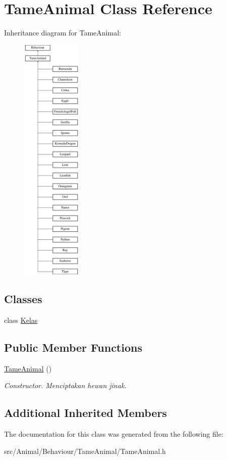 \hypertarget{classTameAnimal}{\section{Tame\+Animal Class Reference}
\label{classTameAnimal}
}
Inheritance diagram for Tame\+Animal\+:\begin{figure}[H]
\begin{center}
\leavevmode
\includegraphics[height=12.000000cm]{classTameAnimal}
\end{center}
\end{figure}
\subsection*{Classes}
\begin{DoxyCompactItemize}
\item 
class \hyperlink{classTameAnimal_1_1Kelas}{Kelas}
\end{DoxyCompactItemize}
\subsection*{Public Member Functions}
\begin{DoxyCompactItemize}
\item 
\hypertarget{classTameAnimal_a8d8af9ffb8b945218e46aae2e0d7c1a7}{\hyperlink{classTameAnimal_a8d8af9ffb8b945218e46aae2e0d7c1a7}{Tame\+Animal} ()}\label{classTameAnimal_a8d8af9ffb8b945218e46aae2e0d7c1a7}

\begin{DoxyCompactList}\small\item\em Constructor. Menciptakan hewan jinak. \end{DoxyCompactList}\end{DoxyCompactItemize}
\subsection*{Additional Inherited Members}


The documentation for this class was generated from the following file\+:\begin{DoxyCompactItemize}
\item 
src/\+Animal/\+Behaviour/\+Tame\+Animal/Tame\+Animal.\+h\end{DoxyCompactItemize}
